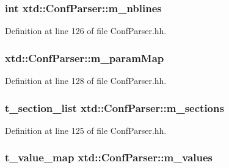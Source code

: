 \hypertarget{classxtd_1_1ConfParser_a5203f3b8cb6e9070b33371c9acabbc8c}{
\subsubsection[{m\-\_\-nblines}]{\setlength{\rightskip}{0pt plus 5cm}int xtd\-::\-Conf\-Parser\-::m\-\_\-nblines\hspace{0.3cm}{\ttfamily [protected]}}}\label{classxtd_1_1ConfParser_a5203f3b8cb6e9070b33371c9acabbc8c}


Definition at line 126 of file Conf\-Parser.\-hh.

\hypertarget{classxtd_1_1ConfParser_abe309999c7964603bde870c7bda16d2e}{
\subsubsection[{m\-\_\-param\-Map}]{ xtd\-::\-Conf\-Parser\-::m\-\_\-param\-Map\hspace{0.3cm}{\ttfamily [protected]}}}\label{classxtd_1_1ConfParser_abe309999c7964603bde870c7bda16d2e}


Definition at line 128 of file Conf\-Parser.\-hh.

\hypertarget{classxtd_1_1ConfParser_a100cffb5f33795e50c87ab5fb2a43963}{
\subsubsection[{m\-\_\-sections}]{\setlength{\rightskip}{0pt plus 5cm}t\-\_\-section\-\_\-list xtd\-::\-Conf\-Parser\-::m\-\_\-sections\hspace{0.3cm}{\ttfamily [protected]}}}\label{classxtd_1_1ConfParser_a100cffb5f33795e50c87ab5fb2a43963}


Definition at line 125 of file Conf\-Parser.\-hh.

\hypertarget{classxtd_1_1ConfParser_a4c58cc4fa96ebaddd180a0c67edb481f}{
\subsubsection[{m\-\_\-values}]{\setlength{\rightskip}{0pt plus 5cm}t\-\_\-value\-\_\-map xtd\-::\-Conf\-Parser\-::m\-\_\-values\hspace{0.3cm}{\ttfamily [protected]}}}\label{classxtd_1_1ConfParser_a4c58cc4fa96ebaddd180a0c67edb481f}



